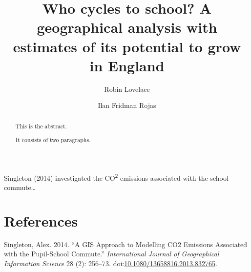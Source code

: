 \documentclass[]{elsarticle} %
\begin{document}
\begin{frontmatter}

  \title{Who cycles to school? A geographical analysis with estimates of its
potential to grow in England}
    \author[University of Leeds]{Robin Lovelace}
    \author[University of Leeds]{Ilan Fridman Rojas}
  
      \address[University of Leeds]{Institute for Transport Studies (ITS), Lifton Villas, 1-3 Lifton Place,
University of Leeds, Leeds, LS2 9JT, United Kingdom}
    \address[University of Leeds]{Leeds Institute for Data Analytics Level 11, Worsley Building Clarendon
Way Leeds LS2 9NL, United Kingdom}
  
  \begin{abstract}
  This is the abstract.
  
  It consists of two paragraphs.
  \end{abstract}
  
 \end{frontmatter}

Singleton (2014) investigated the CO\textsuperscript{2} emissions
associated with the school commute\ldots{}

\section*{References}\label{references}

\hypertarget{refs}{}
\hypertarget{ref-singletonux5fgisux5f2014}{}
Singleton, Alex. 2014. ``A GIS Approach to Modelling CO2 Emissions
Associated with the Pupil-School Commute.'' \emph{International Journal
of Geographical Information Science} 28 (2): 256--73.
doi:\href{https://doi.org/10.1080/13658816.2013.832765}{10.1080/13658816.2013.832765}.
\end{document}
